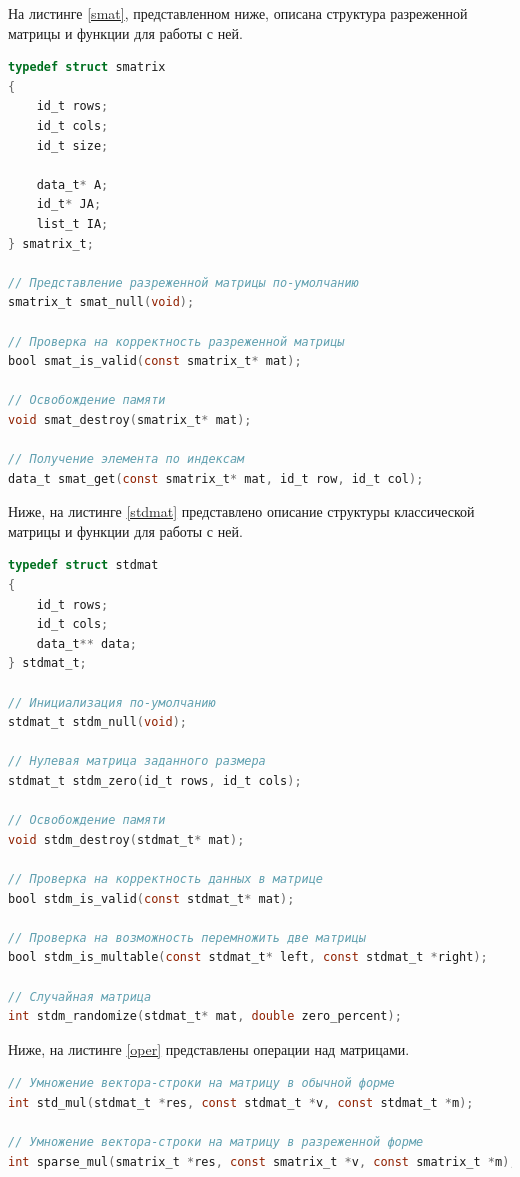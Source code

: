 На листинге \ref{smat}, представленном ниже, описана структура разреженной матрицы и функции для работы с ней.

\begin{lstlisting}[label=smat,language=C,caption=Разреженная матрица и функции для работы с ней]
typedef struct smatrix
{
	id_t rows;
	id_t cols;
	id_t size;
	
	data_t* A;
	id_t* JA;
	list_t IA;
} smatrix_t;

// Представление разреженной матрицы по-умолчанию
smatrix_t smat_null(void);

// Проверка на корректность разреженной матрицы
bool smat_is_valid(const smatrix_t* mat);

// Освобождение памяти
void smat_destroy(smatrix_t* mat);

// Получение элемента по индексам
data_t smat_get(const smatrix_t* mat, id_t row, id_t col);
\end{lstlisting}

Ниже, на листинге \ref{stdmat} представлено описание структуры классической матрицы и функции для работы с ней.

\begin{lstlisting}[label=stdmat,language=C,caption=Классическое представление матрицы и функции для работы с ней]
typedef struct stdmat
{
	id_t rows;
	id_t cols;
	data_t** data;
} stdmat_t;

// Инициализация по-умолчанию
stdmat_t stdm_null(void);

// Нулевая матрица заданного размера
stdmat_t stdm_zero(id_t rows, id_t cols);

// Освобождение памяти
void stdm_destroy(stdmat_t* mat);

// Проверка на корректность данных в матрице
bool stdm_is_valid(const stdmat_t* mat);

// Проверка на возможность перемножить две матрицы
bool stdm_is_multable(const stdmat_t* left, const stdmat_t *right);

// Случайная матрица
int stdm_randomize(stdmat_t* mat, double zero_percent);
\end{lstlisting}

Ниже, на листинге \ref{oper} представлены операции над матрицами.

\begin{lstlisting}[label=oper,language=C,caption=Функции умножения матриц]
// Умножение вектора-строки на матрицу в обычной форме
int std_mul(stdmat_t *res, const stdmat_t *v, const stdmat_t *m);

// Умножение вектора-строки на матрицу в разреженной форме
int sparse_mul(smatrix_t *res, const smatrix_t *v, const smatrix_t *m);
\end{lstlisting}

